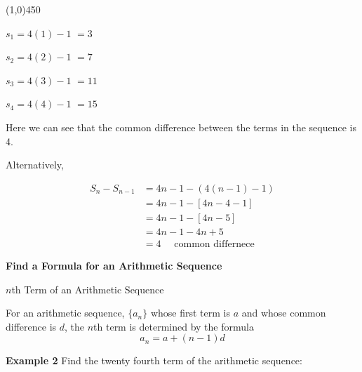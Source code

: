 \documentclass{report}
\begin{document}
\line(1,0){450}

\begin{center}
 $s_1 = 4(1) - 1$
 $=3$
\vspace{2mm}

$s_2 = 4(2) - 1$
$ = 7$
\vspace{2mm}

$s_3 = 4(3) -1$
$=11$
\vspace{2mm}

$s_4 = 4(4) - 1$
$=15$
\vspace{2mm}

Here we can see that the common difference between the terms in the sequence is {\large{4}}.
\end{center}
\vspace{3mm}

Alternatively,

$$
\begin{aligned}
S_n-S_{n-1} & =4 n-1-(4(n-1)-1) \\
& =4 n-1-[4 n-4-1] \\
& =4 n-1-[4 n-5] \\
& =4 n-1-4 n+5 \\
& =4 \quad \text { common differnece}
\end{aligned}
$$
\newpage
\noindent
\begin{LARGE}
	\textbf{Find a Formula for an Arithmetic Sequence}  
\end{LARGE}
\bigbreak \noindent \bigbreak \noindent
\begin{large}
 $n$th Term of an Arithmetic Sequence 
 \vspace{4mm}

\begin{mdframed}
\noindent For an arithmetic sequence, $\{a_n\}$ whose first term is $a$ and whose common difference is $d$, the $n$th term is determined by the formula
 $$a_n = a + (n-1)d$$
\end{mdframed}
\end{large}
\bigbreak \noindent \bigbreak \noindent
\begin{large}
 \begin{center}
	 \textbf{Example 2} 
	 Find the twenty fourth term of the arithmetic sequence:
 \end{center} 
\end{large}
\end{document}
